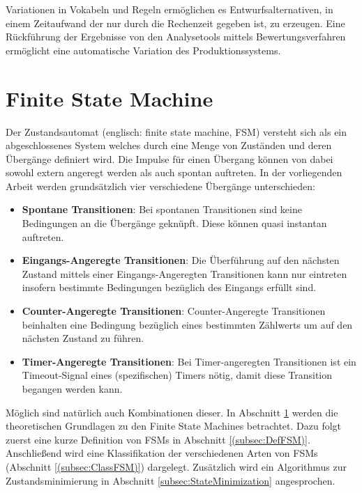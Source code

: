 Variationen in Vokabeln und Regeln ermöglichen es Entwurfsalternativen, in einem Zeitaufwand der nur durch die Rechenzeit gegeben ist, zu erzeugen.
Eine Rückführung der Ergebnisse von den Analysetools mittels Bewertungsverfahren ermöglicht eine automatische Variation des Produktionssystems.


\section{Finite State Machine}
\label{sec:FSM}
Der Zustandsautomat (englisch: finite state machine, FSM) versteht sich als ein abgeschlossenes System welches durch eine Menge von Zuständen und deren Übergänge definiert wird. Die Impulse für einen Übergang können von dabei sowohl extern angeregt werden als auch spontan auftreten. In der vorliegenden Arbeit werden grundsätzlich vier verschiedene Übergänge unterschieden: 
\begin{itemize}
	\item[] \textbf{Spontane Transitionen}: Bei spontanen Transitionen sind keine Bedingungen an die Übergänge geknüpft. Diese können quasi instantan auftreten.
	\item[] \textbf{Eingangs-Angeregte Transitionen}:  Die Überführung auf den nächsten Zustand mittels einer Eingangs-Angeregten Transitionen kann nur eintreten insofern bestimmte Bedingungen bezüglich des Eingangs erfüllt sind.
	\item[] \textbf{Counter-Angeregte Transitionen}: Counter-Angeregte Transitionen beinhalten eine Bedingung bezüglich eines bestimmten Zählwerts um auf den nächsten Zustand zu führen.  
	\item[] \textbf{Timer-Angeregte Transitionen}: Bei Timer-angeregten Transitionen ist ein Timeout-Signal eines (spezifischen) Timers nötig, damit diese Transition begangen werden kann.
\end{itemize}
Möglich sind natürlich auch Kombinationen dieser.
In Abschnitt \ref{sec:FSM} werden die theoretischen Grundlagen zu den Finite State Machines  betrachtet. Dazu folgt zuerst eine kurze Definition von FSMs in Abschnitt \ref{(subsec:DefFSM)}. Anschließend wird eine Klassifikation der verschiedenen Arten von FSMs (Abschnitt \ref{(subsec:ClassFSM)}) dargelegt. Zusätzlich wird ein Algorithmus zur Zustandsminimierung in Abschnitt \ref{subsec:StateMinimization} angesprochen.


